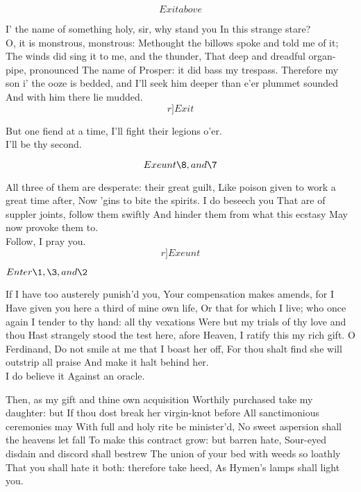 \documentclass[11pt]{book}
\begin{document}
	\[Exit above\]

\9	I' the name of something holy, sir, why stand you
	In this strange stare? \\

\6	O, it is monstrous, monstrous:
	Methought the billows spoke and told me of it;
	The winds did sing it to me, and the thunder,
	That deep and dreadful organ-pipe, pronounced
	The name of Prosper: it did bass my trespass.
	Therefore my son i' the ooze is bedded, and
	I'll seek him deeper than e'er plummet sounded
	And with him there lie mudded. \\ \[r]Exit\]

\8	But one fiend at a time,
	I'll fight their legions o'er. \\

\7	I'll be thy second.

	\[Exeunt \8, and \7\]

\9	All three of them are desperate: their great guilt,
	Like poison given to work a great time after,
	Now 'gins to bite the spirits. I do beseech you
	That are of suppler joints, follow them swiftly
	And hinder them from what this ecstasy
	May now provoke them to. \\

	Follow, I pray you.  \[r]Exeunt\]

\Act 
{}

	\(Enter \1, \3, and \2\)

\1	If I have too austerely punish'd you,
	Your compensation makes amends, for I
	Have given you here a third of mine own life,
	Or that for which I live; who once again
	I tender to thy hand: all thy vexations
	Were but my trials of thy love and thou
	Hast strangely stood the test here, afore Heaven,
	I ratify this my rich gift. O Ferdinand,
	Do not smile at me that I boast her off,
	For thou shalt find she will outstrip all praise
	And make it halt behind her. \\

\3	I do believe it
	Against an oracle.

\1	Then, as my gift and thine own acquisition
	Worthily purchased take my daughter: but
	If thou dost break her virgin-knot before
	All sanctimonious ceremonies may
	With full and holy rite be minister'd,
	No sweet aspersion shall the heavens let fall
	To make this contract grow: but barren hate,
	Sour-eyed disdain and discord shall bestrew
	The union of your bed with weeds so loathly
	That you shall hate it both: therefore take heed,
	As Hymen's lamps shall light you. \\
\end{document}
